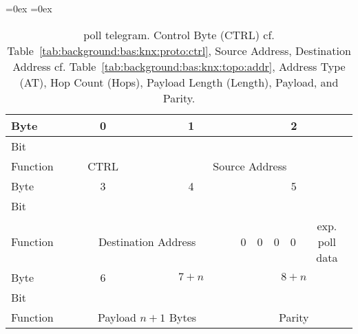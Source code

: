 		\begin{table}
			\aboverulesep=0ex
			\belowrulesep=0ex
			\renewcommand{\arraystretch}{1.2}
			
			\centering
			\begin{tabular}{|l|c|c|c|c|c|c|c|c|c|c|c|c|c|c|c|c|c|c|c|c|c|c|c|c|}
				\toprule
				Byte & \multicolumn{8}{c|}{0} & \multicolumn{8}{c|}{1} & \multicolumn{8}{c|}{2} \\\midrule
				Bit & & & & & & & & & & & & & & & & & & & & & & & & \\\midrule
				Function & \multicolumn{8}{c|}{CTRL} & \multicolumn{16}{c|}{Source Address} \\\bottomrule
				\toprule
				Byte & \multicolumn{8}{c|}{3} & \multicolumn{8}{c|}{4} & \multicolumn{8}{c|}{5} \\\midrule
				Bit & & & & & & & & & & & & & & & & & & & & & & & & \\\midrule
				Function & \multicolumn{16}{c|}{Destination Address} & 0 & 0 & 0 & 0 & \multicolumn{4}{c|}{exp. poll data} \\\bottomrule
				\toprule
				Byte & \multicolumn{8}{c|}{6} & \multicolumn{8}{c|}{$7+n$} & \multicolumn{8}{c|}{$8+n$} \\\midrule
				Bit & & & & & & & & & & & & & & & & & & & & & & & & \\\midrule
				Function & \multicolumn{16}{c|}{Payload $n+1$ Bytes} & \multicolumn{8}{c|}{Parity} \\\bottomrule
			\end{tabular}
			\caption[\knx poll telegram]{\knx poll telegram. Control Byte (CTRL) cf. Table~\ref{tab:background:bas:knx:proto:ctrl}, Source Address, Destination Address cf. Table~\ref{tab:background:bas:knx:topo:addr}, Address Type (AT), Hop Count (Hops), Payload Length (Length), Payload, and Parity.}
			\label{tab:background:bas:knx:proto:knx-poll}
		\end{table}
		
